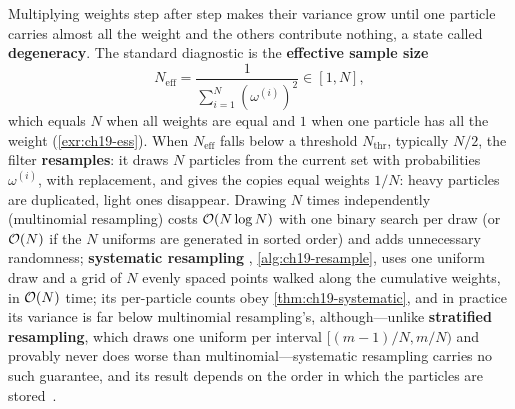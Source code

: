 Multiplying weights step after step makes their variance grow until one
particle carries almost all the weight and the others contribute nothing,
a state called
\textbf{degeneracy}. The
standard diagnostic is the \textbf{effective sample size}
\begin{equation}
  N_{\mathrm{eff}} = \frac{1}{\sum_{i=1}^N (\omega^{(i)})^2} \in [1, N],
  \label{eq:ch19-ess}
\end{equation}
which equals $N$ when all weights are equal and $1$ when one particle has
all the weight (\cref{exr:ch19-ess}). When $N_{\mathrm{eff}}$ falls below a
threshold $N_{\mathrm{thr}}$, typically $N/2$, the filter
\textbf{resamples}: it draws $N$ particles from the
current set with probabilities $\omega^{(i)}$, with replacement, and gives the
copies equal weights $1/N$: heavy particles are duplicated, light ones
disappear. Drawing $N$ times independently (multinomial resampling)
costs $\mathcal{O}\!\left(N \log N\right)$ with one binary search per draw (or $\mathcal{O}\!\left(N\right)$ if
the $N$ uniforms are generated in sorted order) and adds unnecessary
randomness;
\textbf{systematic resampling}
\cite{kitagawa1996monte,arulampalam2002tutorial}, \cref{alg:ch19-resample},
uses one uniform draw and a grid of $N$ evenly spaced points walked along
the cumulative weights, in $\mathcal{O}\!\left(N\right)$ time; its per-particle counts obey
\cref{thm:ch19-systematic}, and in practice its variance is far below
multinomial resampling's, although---unlike \textbf{stratified
resampling}, which draws one uniform per
interval $[(m-1)/N, m/N)$ and provably never does worse than
multinomial---systematic resampling carries no such guarantee, and its
result depends on the order in which the particles are
stored~\cite{douc2005comparison}.

\begin{algorithm}[htb]
\caption{Systematic resampling}
\label{alg:ch19-resample}
\Fn{\NlfSystematicResample{$\omega$}}{
  draw $u \sim \mathcal{U}[0, 1/N)$; $c \gets \omega^{(1)}$; $i \gets 1$\label{alg:ch19-resample:draw}\;
  \tcp{the test $i < N$ guards against rounding: $\sum_i \omega^{(i)}$ may be $1 - \eps$}
  \For{$m = 1, \dots, N$}{
    $u_m \gets u + (m - 1)/N$\label{alg:ch19-resample:grid}\;
    \While{$u_m > c$ \textnormal{and} $i < N$}{$i \gets i + 1$; $c \gets c + \omega^{(i)}$\label{alg:ch19-resample:walk}\;}
    $j_m \gets i$\;
  }
  \KwRet $(j_1, \dots, j_N)$\;
}
\end{algorithm}

